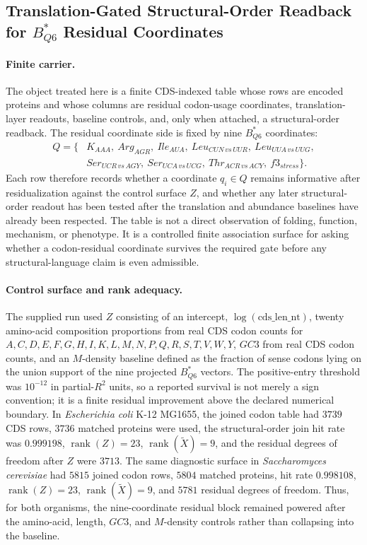 \subsection{Translation-Gated Structural-Order Readback for $B^*_{Q6}$ Residual Coordinates}
\label{subsec:q6-translation-gated-structural-order-cross-layer}

\paragraph{Finite carrier.}
The object treated here is a finite CDS-indexed table whose rows are encoded proteins and whose columns are residual codon-usage coordinates, translation-layer readouts, baseline controls, and, only when attached, a structural-order readback. The residual coordinate side is fixed by nine $B^*_{Q6}$ coordinates:
$$
\begin{aligned}
Q=\{&K_{AAA},\ Arg_{AGR},\ Ile_{AUA},\ Leu_{CUN\,vs\,UUR},\ Leu_{UUA\,vs\,UUG},\\
&Ser_{UCR\,vs\,AGY},\ Ser_{UCA\,vs\,UCG},\ Thr_{ACR\,vs\,ACY},\ f3_{stress}\}.
\end{aligned}
$$
Each row therefore records whether a coordinate $q_i\in Q$ remains informative after residualization against the control surface $Z$, and whether any later structural-order readout has been tested after the translation and abundance baselines have already been respected. The table is not a direct observation of folding, function, mechanism, or phenotype. It is a controlled finite association surface for asking whether a codon-residual coordinate survives the required gate before any structural-language claim is even admissible.

\paragraph{Control surface and rank adequacy.}
The supplied run used $Z$ consisting of an intercept, $\log(\mathrm{cds\_len\_nt})$, twenty amino-acid composition proportions from real CDS codon counts for $A,C,D,E,F,G,H,I,K,L,M,N,P,Q,R,S,T,V,W,Y$, $GC3$ from real CDS codon counts, and an $M$-density baseline defined as the fraction of sense codons lying on the union support of the nine projected $B^*_{Q6}$ vectors. The positive-entry threshold was $10^{-12}$ in partial-$R^2$ units, so a reported survival is not merely a sign convention; it is a finite residual improvement above the declared numerical boundary. In \emph{Escherichia coli} K-12 MG1655, the joined codon table had $3739$ CDS rows, $3736$ matched proteins were used, the structural-order join hit rate was $0.999198$, $\operatorname{rank}(Z)=23$, $\operatorname{rank}(\widetilde X)=9$, and the residual degrees of freedom after $Z$ were $3713$. The same diagnostic surface in \emph{Saccharomyces cerevisiae} had $5815$ joined codon rows, $5804$ matched proteins, hit rate $0.998108$, $\operatorname{rank}(Z)=23$, $\operatorname{rank}(\widetilde X)=9$, and $5781$ residual degrees of freedom. Thus, for both organisms, the nine-coordinate residual block remained powered after the amino-acid, length, $GC3$, and $M$-density controls rather than collapsing into the baseline.

